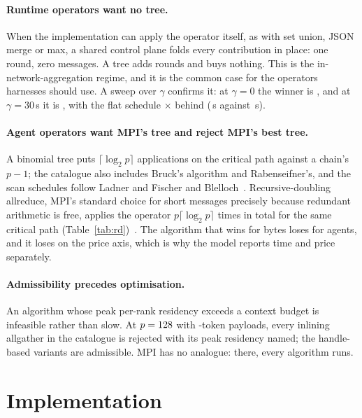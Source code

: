 \documentclass[sigconf,nonacm]{acmart}
\newcommand{\code}[1]{\texttt{\small #1}}
\begin{document}
\paragraph{Runtime operators want no tree.} When the implementation can apply
the operator itself, as with set union, JSON merge or max, a shared control plane
folds every contribution in place: one round, zero messages. A tree adds rounds
and buys nothing. This is the in-network-aggregation regime, and it is the common
case for the operators harnesses should use. A sweep over $\gamma$ confirms it:
at $\gamma=0$ the winner is \code{\winnerGammaZero}, and at $\gamma=30$\,s it is
\code{\winnerGammaThirty}, with the flat schedule \flatPenalty$\times$ behind
(\flatGammaThirty\,s against \bestGammaThirty\,s).

\paragraph{Agent operators want MPI's tree and reject MPI's best tree.} A
binomial tree puts $\lceil\log_2 p\rceil$ applications on the critical path
against a chain's $p{-}1$; the catalogue also includes Bruck's algorithm and
Rabenseifner's, and the scan schedules follow Ladner and Fischer and
Blelloch~\cite{bruck1997efficient,rabenseifner2004more,ladner1980parallel,blelloch1990prefix}.
Recursive-doubling allreduce, MPI's standard choice for short messages precisely
because redundant arithmetic is free, applies the operator $p\lceil\log_2
p\rceil$ times in total for the same critical path
(Table~\ref{tab:rd})~\cite{thakur2005optimization,rabenseifner2004optimization}.
The algorithm that wins for bytes loses for agents, and it loses on the price
axis, which is why the model reports time and price separately.

\paragraph{Admissibility precedes optimisation.} An algorithm whose peak
per-rank residency exceeds a context budget is infeasible rather than slow. At
$p=128$ with \ctxN-token payloads, every inlining allgather in the catalogue is
rejected with its peak residency named; the handle-based variants are admissible.
MPI has no analogue: there, every algorithm runs.

\section{Implementation}
\label{sec:impl}
\end{document}
